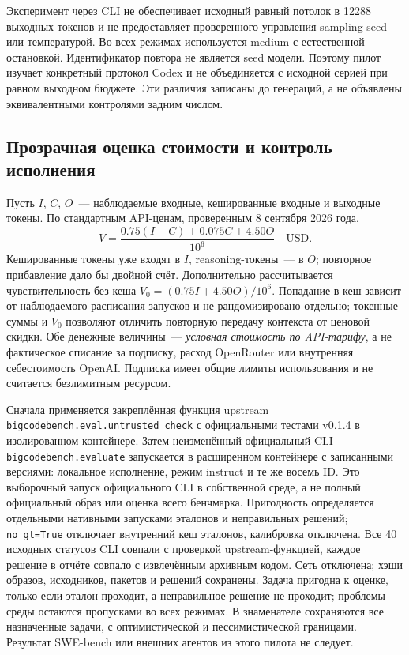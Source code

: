 Эксперимент через CLI не обеспечивает исходный равный потолок в 12288 выходных токенов и не предоставляет проверенного управления sampling seed или температурой. Во всех режимах используется medium с естественной остановкой. Идентификатор повтора не является seed модели. Поэтому пилот изучает конкретный протокол Codex и не объединяется с исходной серией при равном выходном бюджете. Эти различия записаны до генераций, а не объявлены эквивалентными контролями задним числом.

\subsection{Прозрачная оценка стоимости и контроль исполнения}
Пусть $I$, $C$, $O$~--- наблюдаемые входные, кешированные входные и выходные токены. По стандартным API-ценам, проверенным 8 сентября 2026 года,
\begin{equation}
 V=\frac{0.75(I-C)+0.075C+4.50O}{10^6}\quad\mathrm{USD}.
\end{equation}
Кешированные токены уже входят в $I$, reasoning-токены~--- в $O$; повторное прибавление дало бы двойной счёт. Дополнительно рассчитывается чувствительность без кеша $V_0=(0.75I+4.50O)/10^6$. Попадание в кеш зависит от наблюдаемого расписания запусков и не рандомизировано отдельно; токенные суммы и $V_0$ позволяют отличить повторную передачу контекста от ценовой скидки. Обе денежные величины~--- \emph{условная стоимость по API-тарифу}, а не фактическое списание за подписку, расход OpenRouter или внутренняя себестоимость OpenAI. Подписка имеет общие лимиты использования и не считается безлимитным ресурсом.

Сначала применяется закреплённая функция upstream \texttt{bigcodebench.eval.untrusted\_check} с официальными тестами v0.1.4 в изолированном контейнере. Затем неизменённый официальный CLI \texttt{bigcodebench.evaluate} запускается в расширенном контейнере с записанными версиями: локальное исполнение, режим instruct и те же восемь ID. Это выборочный запуск официального CLI в собственной среде, а не полный официальный образ или оценка всего бенчмарка. Пригодность определяется отдельными нативными запусками эталонов и неправильных решений; \texttt{no\_gt=True} отключает внутренний кеш эталонов, калибровка отключена. Все 40 исходных статусов CLI совпали с проверкой upstream-функцией, каждое решение в отчёте совпало с извлечённым архивным кодом. Сеть отключена; хэши образов, исходников, пакетов и решений сохранены. Задача пригодна к оценке, только если эталон проходит, а неправильное решение не проходит; проблемы среды остаются пропусками во всех режимах. В знаменателе сохраняются все назначенные задачи, с оптимистической и пессимистической границами. Результат SWE-bench или внешних агентов из этого пилота не следует.

